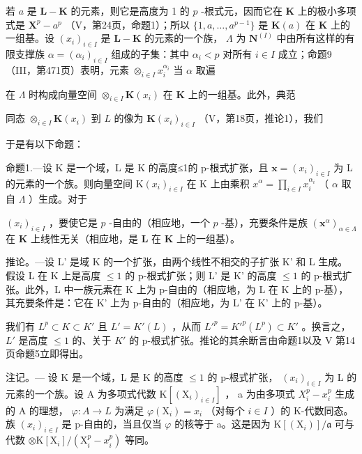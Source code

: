 若 \(a\) 是 \(\mathbf{L} - \mathbf{K}\) 的元素，则它是高度为 1 的 \(p\) -根式元，因而它在 \(\mathbf{K}\) 上的极小多项式是 \(\mathbf{X}^p - a^p\) （V，第24页，命题1）；所以 \(\{1, a, \ldots, a^{p-1}\}\) 是 \(\mathbf{K}(a)\) 在 \(\mathbf{K}\) 上的一组基。设 \((x_i)_{i \in I}\) 是 \(\mathbf{L} - \mathbf{K}\) 的元素的一个族， \(\Lambda\) 为 \(\mathbf{N}^{(I)}\) 中由所有这样的有限支撑族 \(\alpha = (\alpha_i)_{i \in I}\) 组成的子集：其中 \(\alpha_i < p\) 对所有 \(i \in I\) 成立；命题9（III，第471页）表明，元素 \(\otimes_{i \in I} x_i^{\alpha_i}\) 当 \(\alpha\) 取遍

在 \(\Lambda\) 时构成向量空间 \(\otimes_{i\in I}\mathbf{K}(x_i)\) 在 \(\mathbf{K}\) 上的一组基。此外，典范

同态 \(\otimes_{i\in I}\mathbf{K}(x_i)\) 到 \(L\) 的像为 \(\mathbf{K}(x_i)_{i\in I}\) （V，第18页，推论1），我们

于是有以下命题：

命题1.---设 K 是一个域，L 是 K 的高度≤1的 p-根式扩张，且 \(\mathbf{x} = (x_{i})_{i \in I}\) 为 L 的元素的一个族。则向量空间 \(\mathrm{K}(x_{i})_{i \in I}\) 在 K 上由乘积 \(x^{\alpha} = \prod_{i \in I} x_{i}^{\alpha_{i}}\) （ \(\alpha\) 取自 \(\Lambda\) ）生成。对于

\((x_{i})_{i\in I}\) ，要使它是 \(p\) -自由的（相应地，一个 \(p\) -基），充要条件是族 \((\mathbf{x}^{\alpha})_{\alpha \in \Lambda}\) 在 \(\mathbf{K}\) 上线性无关（相应地，是 \(\mathbf{L}\) 在 \(\mathbf{K}\) 上的一组基）。

推论。---设 L' 是域 K 的一个扩张，由两个线性不相交的子扩张 K' 和 L 生成。假设 L 在 K 上是高度 \(\leqslant 1\) 的 p-根式扩张；则 L' 是 K' 的高度 \(\leqslant 1\) 的 p-根式扩张。此外，L 中一族元素在 K 上为 p-自由的（相应地，为 L 在 K 上的 p-基），其充要条件是：它在 K' 上为 p-自由的（相应地，为 L' 在 K' 上的 p-基）。

我们有 \(L^{p} \subset K \subset K'\) 且 \(L' = K'(L)\) ，从而 \(L'^{p} = K'^{p}(L^{p}) \subset K'\) 。换言之， \(L'\) 是高度 \(\leqslant 1\) 的、关于 \(K'\) 的 p-根式扩张。推论的其余断言由命题1以及 V 第14页命题5立即得出。

注记。--- 设 K 是一个域，L 是 K 的高度 \(\leqslant1\) 的 p-根式扩张， \((x_{i})_{i\in I}\) 为 L 的元素的一个族。设 A 为多项式代数 \(\mathrm{K}[(\mathrm{X}_{i})_{i\in I}]\) ， a 为由多项式 \(X_{i}^{p}-x_{i}^{p}\) 生成的 A 的理想， \(\varphi:A\to L\) 为满足 \(\varphi(\mathrm{X}_{i})=x_{i}\) （对每个 \(i\in I\) ）的 K-代数同态。族 \((x_{i})_{i\in I}\) 是 p-自由的，当且仅当 \(\varphi\) 的核等于 a。这是因为 \(\mathrm{K}[(\mathrm{X}_{i})]/\mathfrak{a}\) 可与代数 \(\otimes\mathrm{K}[\mathrm{X}_{i}]/(\mathrm{X}_{i}^{p}-x_{i}^{p})\) 等同。

